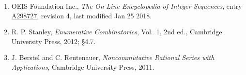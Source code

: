 \documentclass[11pt]{article}
\theoremstyle{definition}
\begin{document}
\begin{enumerate}

\item OEIS Foundation Inc., \emph{The On-Line Encyclopedia of Integer Sequences}, entry \href{https://oeis.org/A298727}{A298727}, revision 4, last modified Jan 25 2018.

\item R. P. Stanley, \emph{Enumerative Combinatorics}, Vol.~1, 2nd ed., Cambridge University Press, 2012; \S4.7.

\item J. Berstel and C. Reutenauer, \emph{Noncommutative Rational Series with Applications}, Cambridge University Press, 2011.

\end{enumerate}
\end{document}
